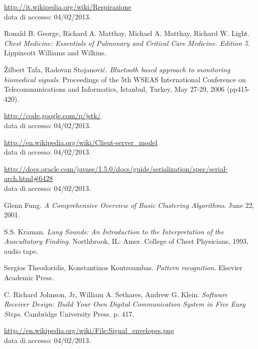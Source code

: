 \begin{thebibliography}{99}
  \url{http://it.wikipedia.org/wiki/Respirazione}\\
  data di accesso: 04/02/2013.

  Ronald B. George, Richard A. Matthay, Michael A. Matthay, Richard W. Light.
  \emph{Chest Medicine: Essentials of Pulmonary and Critical Care Medicine. Edition 5}.
   Lippincott Williams and Wilkins.





  \v Zilbert Tafa, Radovan Stojanovi\'c.
  \emph{Bluetooth based approach to monitoring biomedical signals}.
  Proceedings of the 5th WSEAS International Conference on Telecommunications and Informatics, Istanbul, Turkey, May 27-29, 2006 (pp415-420).


  \url{http://code.google.com/p/jstk/}\\
  data di accesso: 04/02/2013.

  \url{http://en.wikipedia.org/wiki/Client-server_model}\\
  data di accesso: 04/02/2013.

  \url{http://docs.oracle.com/javase/1.5.0/docs/guide/serialization/spec/serial-arch.html#6428}\\
  data di accesso: 04/02/2013.

  Glenn Fung.
  \emph{A Comprehensive Overview of Basic Clustering Algorithms}.
  June 22, 2001.


  S.S. Kraman.
  \emph{Lung Sounds: An Introduction to the Interpretation of the Auscultatory Finding}.
  Northbrook, IL: Amer. College of Chest Physicians, 1993, audio tape.

  Sergios Theodoridis, Konstantinos Koutroumbas.
  \emph{Pattern recognition}.
  Elsevier Academic Press.

  C. Richard Johnson, Jr, William A. Sethares, Andrew G. Klein.
  \emph{Software Receiver Design: Build Your Own Digital Communication System in Five Easy Steps}.
  Cambridge University Press. p. 417.

  \url{http://en.wikipedia.org/wiki/File:Signal_envelopes.png}\\
  data di accesso: 04/02/2013.


\end{thebibliography}
